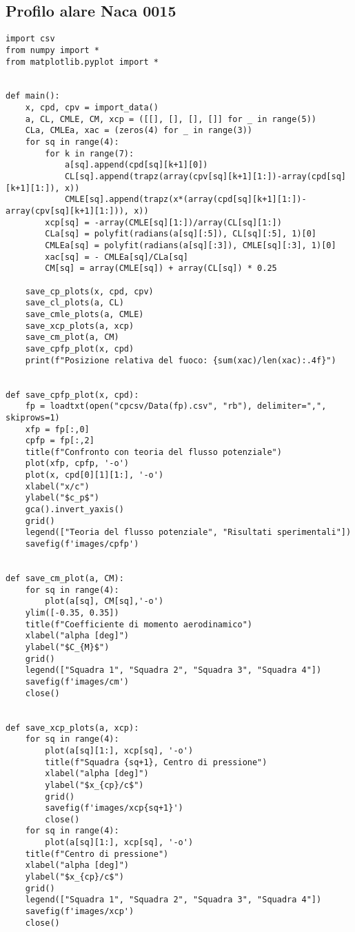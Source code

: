 \subsection{Profilo alare Naca 0015}\label{b5}
\begin{lstlisting}
import csv
from numpy import *
from matplotlib.pyplot import *


def main():
    x, cpd, cpv = import_data()
    a, CL, CMLE, CM, xcp = ([[], [], [], []] for _ in range(5))
    CLa, CMLEa, xac = (zeros(4) for _ in range(3))
    for sq in range(4):
        for k in range(7):
            a[sq].append(cpd[sq][k+1][0])
            CL[sq].append(trapz(array(cpv[sq][k+1][1:])-array(cpd[sq][k+1][1:]), x))
            CMLE[sq].append(trapz(x*(array(cpd[sq][k+1][1:])-array(cpv[sq][k+1][1:])), x))
        xcp[sq] = -array(CMLE[sq][1:])/array(CL[sq][1:])
        CLa[sq] = polyfit(radians(a[sq][:5]), CL[sq][:5], 1)[0]
        CMLEa[sq] = polyfit(radians(a[sq][:3]), CMLE[sq][:3], 1)[0]
        xac[sq] = - CMLEa[sq]/CLa[sq]
        CM[sq] = array(CMLE[sq]) + array(CL[sq]) * 0.25

    save_cp_plots(x, cpd, cpv)
    save_cl_plots(a, CL)
    save_cmle_plots(a, CMLE)
    save_xcp_plots(a, xcp)
    save_cm_plot(a, CM)
    save_cpfp_plot(x, cpd)
    print(f"Posizione relativa del fuoco: {sum(xac)/len(xac):.4f}")

    
def save_cpfp_plot(x, cpd):
    fp = loadtxt(open("cpcsv/Data(fp).csv", "rb"), delimiter=",", skiprows=1)
    xfp = fp[:,0]
    cpfp = fp[:,2]
    title(f"Confronto con teoria del flusso potenziale")
    plot(xfp, cpfp, '-o')
    plot(x, cpd[0][1][1:], '-o')
    xlabel("x/c")
    ylabel("$c_p$")
    gca().invert_yaxis()
    grid()
    legend(["Teoria del flusso potenziale", "Risultati sperimentali"])
    savefig(f'images/cpfp')


def save_cm_plot(a, CM):
    for sq in range(4):
        plot(a[sq], CM[sq],'-o')
    ylim([-0.35, 0.35])
    title(f"Coefficiente di momento aerodinamico")
    xlabel("alpha [deg]")
    ylabel("$C_{M}$")
    grid()
    legend(["Squadra 1", "Squadra 2", "Squadra 3", "Squadra 4"])
    savefig(f'images/cm')
    close()


def save_xcp_plots(a, xcp):
    for sq in range(4):
        plot(a[sq][1:], xcp[sq], '-o')
        title(f"Squadra {sq+1}, Centro di pressione")
        xlabel("alpha [deg]")
        ylabel("$x_{cp}/c$")
        grid()
        savefig(f'images/xcp{sq+1}')
        close()
    for sq in range(4):
        plot(a[sq][1:], xcp[sq], '-o') 
    title(f"Centro di pressione")
    xlabel("alpha [deg]")
    ylabel("$x_{cp}/c$")
    grid()
    legend(["Squadra 1", "Squadra 2", "Squadra 3", "Squadra 4"])
    savefig(f'images/xcp')
    close()



\end{lstlisting}
